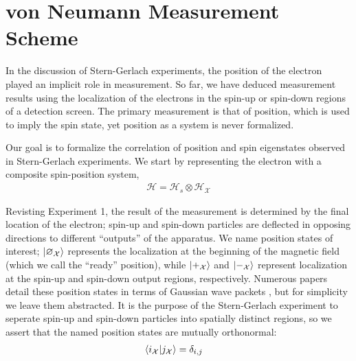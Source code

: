 \section{von Neumann Measurement Scheme} \label{vnms}
In the discussion of Stern-Gerlach experiments, the position of the electron played an implicit role in measurement. So far, we have deduced measurement results using the localization of the electrons in the spin-up or spin-down regions of a detection screen. The primary measurement is that of position, which is used to imply the spin state, yet position as a system is never formalized.

Our goal is to formalize the correlation of position and spin eigenstates observed in Stern-Gerlach experiments. We start by representing the electron with a composite spin-position system,
\begin{align}
  \mathcal{H} = \mathcal{H}_s \otimes \mathcal{H}_\mathcal{X}
\end{align}

Revisting Experiment 1, the result of the measurement is determined by the final location of the electron; spin-up and spin-down particles are deflected in opposing directions to different ``outputs'' of the apparatus. We name position states of interest; $\ket{\varnothing_\mathcal{X}}$ represents the localization at the beginning of the magnetic field (which we call the ``ready'' position), while $\ket{+_{\mathcal{X}}}$ and $\ket{-_{\mathcal{X}}}$ represent localization at the spin-up and spin-down output regions, respectively. Numerous papers detail these position states in terms of Gaussian wave packets \cite{Venugopalan}, but for simplicity we leave them abstracted. It is the purpose of the Stern-Gerlach experiment to seperate spin-up and spin-down particles into spatially distinct regions, so we assert that the named position states are mutually orthonormal:
\begin{align}
  \braket{i_\mathcal{X}| j_\mathcal{X}} &= \delta_{i,j}
\end{align}

